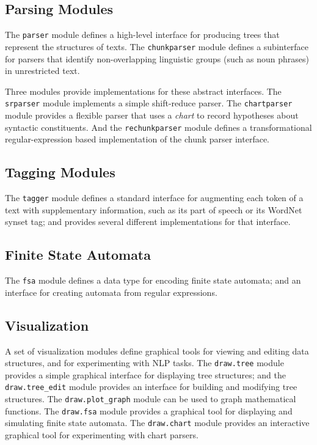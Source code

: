 \documentclass[11pt]{article}
\begin{document}
\subsection*{Parsing Modules}

The \texttt{parser} module defines a high-level interface for
producing trees that represent the structures of texts.  The
\texttt{chunkparser} module defines a subinterface for parsers that
identify non-overlapping linguistic groups (such as noun phrases) in
unrestricted text.

Three modules provide implementations for these abstract interfaces.
The \texttt{srparser} module implements a simple shift-reduce parser.
The \texttt{chartparser} module provides a flexible parser that uses a
\emph{chart} to record hypotheses about syntactic constituents.  And
the \texttt{rechunkparser} module defines a transformational
regular-expression based implementation of the chunk parser interface.

\subsection*{Tagging Modules}

The \texttt{tagger} module defines a standard interface for augmenting
each token of a text with supplementary information, such as its part
of speech or its WordNet synset tag; and provides several different
implementations for that interface.

\subsection*{Finite State Automata}

The \texttt{fsa} module defines a data type for encoding finite state
automata; and an interface for creating automata from regular
expressions.

\subsection*{Visualization}

A set of visualization modules define graphical tools for viewing and
editing data structures, and for experimenting with NLP tasks.  The
\texttt{draw.tree} module provides a simple graphical interface for
displaying tree structures; and the
\texttt{draw.tree\_edit} module provides an interface for building and
modifying tree structures.  The \texttt{draw.plot\_graph} module can be
used to graph mathematical functions.  The \texttt{draw.fsa} module
provides a graphical tool for displaying and simulating finite state
automata.  The \texttt{draw.chart} module provides an interactive
graphical tool for experimenting with chart parsers.
\end{document}
